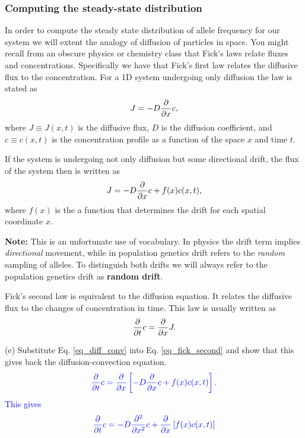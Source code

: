 \documentclass[12pt]{article}    %
\newcommand{\dd}[1]{{\partial \over \partial {#1}}}
\newcommand{\ddd}[1]{{\partial^2 \over \partial {#1} ^2}}
\begin{document}
\subsubsection*{Computing the steady-state distribution}

In order to compute the steady state distribution of allele frequency for our
system we will extent the analogy of diffusion of particles in space. You might
recall from an obscure physics or chemistry class that Fick's laws relate fluxes
and concentrations. Specifically we have that Fick's first law relates the
diffusive flux to the concentration. For a 1D system undergoing only diffusion
the law is stated as
\begin{equation}\label{eq_fick_first}
  J = - D \dd{x} c,
\end{equation}
where $J \equiv J(x, t)$ is the diffusive flux, $D$ is the diffusion
coefficient, and $c \equiv c(x, t)$ is the concentration profile as a function
of the space $x$ and time $t$.

If the system is undergoing not only diffusion but some directional drift, the
flux of the system then is written as
\begin{equation}\label{eq_diff_conv}
  J = - D \dd{x} c + f(x)c(x, t),
\end{equation}
where $f(x)$ is the a function that determines the drift for each spatial
coordinate $x$.

{\bf Note:} This is an unfortunate use of vocabulary. In physics the drift term
implies \textit{directional} movement, while in population genetics drift refers
to the \textit{random} sampling of alleles. To distinguish both drifts we will
always refer to the population genetics drift as {\bf random drift}.

Fick's second law is equivalent to the diffusion equation. It relates the
diffusive flux to the changes of concentration in time. This law is usually
written as
\begin{equation}\label{eq_fick_second}
  \dd{t} c = \dd{x}J.
\end{equation}

\noindent
(e) Substitute Eq. \ref{eq_diff_conv} into Eq. \ref{eq_fick_second} and show
that this gives back the diffusion-convection equation.
\begin{equation}
  \color{blue}
  \dd{t} c = \dd{x} \left[ -D \dd{x}c + f(x)c(x,t) \right].
\end{equation}
\textcolor{blue}{
This gives
}
\begin{equation}
  \color{blue}
  \dd{t}c = - D \ddd{x}c + \dd{x}\left[ f(x)c(x, t) \right]
\end{equation}
\end{document}
